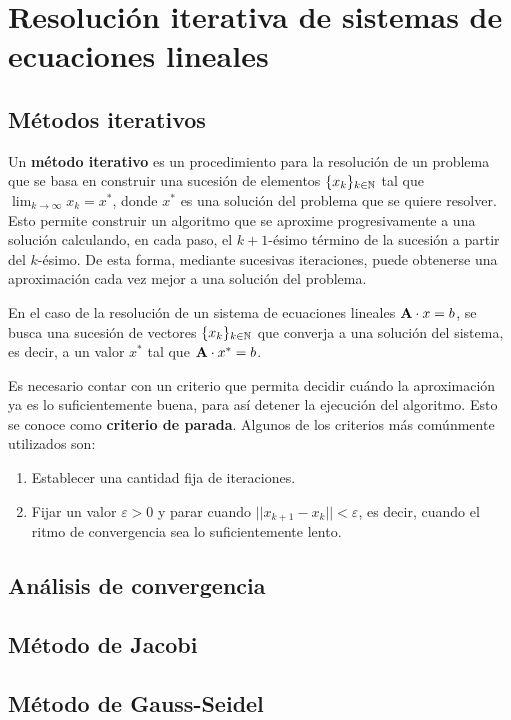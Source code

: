 \section{Resolución iterativa de sistemas de ecuaciones lineales}
\subsection{Métodos iterativos}
Un \textbf{método iterativo} es un procedimiento para la resolución de un
problema que se basa en construir una sucesión de elementos $\lbrace x_k
\rbrace_{k \in \mathbb{N}}$ tal que $\lim_{k\to\infty} x_k = x^\ast$, donde $x^\ast$
es una solución del problema que se quiere resolver.
Esto permite construir un algoritmo que se aproxime progresivamente a una
solución calculando, en cada paso, el $k+1$-ésimo término de la sucesión a
partir del $k$-ésimo. De esta forma, mediante sucesivas iteraciones, puede
obtenerse una aproximación cada vez mejor a una solución del problema.

En el caso de la resolución de un sistema de ecuaciones lineales $\mathbf{A}
\cdot x = b$, se busca una sucesión de vectores $\lbrace x_k \rbrace_{k \in
\mathbb{N}}$ que converja a una solución del sistema, es decir, a un valor $x^\ast$
tal que $\mathbf{A} \cdot x^\ast = b$.

Es necesario contar con un criterio que permita decidir cuándo la aproximación
ya es lo suficientemente buena, para así detener la ejecución del algoritmo.
Esto se conoce como \textbf{criterio de parada}. Algunos de los criterios
más comúnmente utilizados son:
\begin{enumerate}[label=(\roman*)]
\item Establecer una cantidad fija de iteraciones.
\item Fijar un valor $\varepsilon > 0$ y parar cuando $||x_{k+1} - x_k||
    < \varepsilon$, es decir, cuando el ritmo de convergencia sea lo
    suficientemente lento.
\end{enumerate}

\subsection{Análisis de convergencia}
\subsection{Método de Jacobi}
\subsection{Método de Gauss-Seidel}
